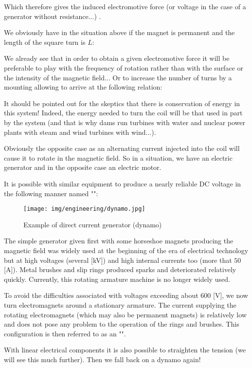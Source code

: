 	Which therefore gives the induced electromotive force (or voltage in the case of a generator without resistance...) .

	We obviously have in the situation above if the magnet is permanent and the length of the square turn is $L$:
	
	We already see that in order to obtain a given electromotive force it will be preferable to play with the frequency of rotation rather than with the surface or the intensity of the magnetic field... Or to increase the number of turns by a mounting allowing to arrive at the following relation:
	
	It should be pointed out for the skeptics that there is conservation of energy in this system! Indeed, the energy needed to turn the coil will be that used in part by the system (and that is why dams run turbines with water and nuclear power plants with steam and wind turbines with wind...).
	
	Obviously the opposite case as an alternating current injected into the coil will cause it to rotate in the magnetic field. So in a situation, we have an electric generator and in the opposite case an electric motor.

	It is possible with similar equipment to produce a nearly reliable DC voltage in the following manner named "":
	\begin{figure}[H]
		\centering
		\texttt{[image: img/engineering/dynamo.jpg]}
		\caption{Example of direct current generator (dynamo)}
	\end{figure}
	The simple generator given first with some horseshoe magnets producing the magnetic field was widely used at the beginning of the era of electrical technology but at high voltages (several [kV]) and high internal currents too (more that $50$ [A]). Metal brushes and slip rings produced sparks and deteriorated relatively quickly. Currently, this rotating armature machine is no longer widely used.

	To avoid the difficulties associated with voltages exceeding about $600$ [V], we now turn electromagnets around a stationary armature. The current supplying the rotating electromagnets (which may also be permanent magnets) is relatively low and does not pose any problem to the operation of the rings and brushes. This configuration is then referred to as an "".

	With linear electrical components it is also possible to straighten the tension (we will see this much further). Then we fall back on a dynamo again!
	
